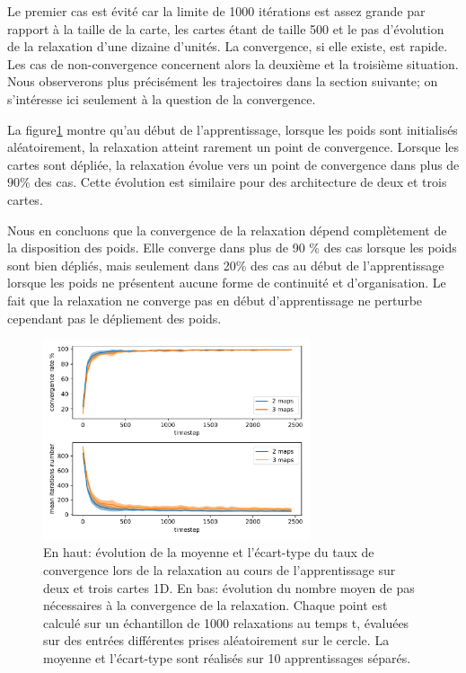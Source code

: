\documentclass[../main]{subfiles}
\begin{document}
Le premier cas est évité car la limite de 1000 itérations est assez grande par rapport à la taille de la carte, les cartes étant de taille 500 et le pas d'évolution de la relaxation d'une dizaine d'unités. 
La convergence, si elle existe, est rapide. Les cas de non-convergence concernent alors la deuxième et la troisième situation.
Nous observerons plus précisément les trajectoires dans la section suivante; on s'intéresse ici seulement à la question de la convergence.

La figure\ref{fig:conv_evolution} montre qu'au début de l'apprentissage, lorsque les poids sont initialisés aléatoirement, la relaxation atteint rarement un point de convergence. Lorsque les cartes sont dépliée, la relaxation évolue vers un point de convergence dans plus de $90 \%$ des cas. Cette évolution est similaire pour des architecture de deux et trois cartes.

Nous en  concluons que la convergence de la relaxation dépend complètement de la disposition des poids. Elle converge dans plus de 90 \% des cas lorsque les poids sont bien dépliés, mais seulement dans 20\% des cas au début de l'apprentissage lorsque les poids ne présentent aucune forme de continuité et d'organisation.
Le fait que la relaxation ne converge pas en début d'apprentissage ne perturbe cependant pas le dépliement des poids.

\begin{figure}
\centering
\includegraphics[width=0.7\textwidth]{1D_conv_evolution_total.pdf}
\caption{En haut: évolution de la moyenne et l'écart-type du taux de convergence lors de la relaxation au cours de l'apprentissage sur deux et trois cartes 1D. En bas: évolution du nombre moyen de pas nécessaires à la convergence de la relaxation.
Chaque point est calculé sur un échantillon de 1000 relaxations au temps t, évaluées sur des entrées différentes prises aléatoirement sur le cercle. La moyenne et l'écart-type sont réalisés sur 10 apprentissages séparés.}
\label{fig:conv_evolution}
\end{figure}
\end{document}
